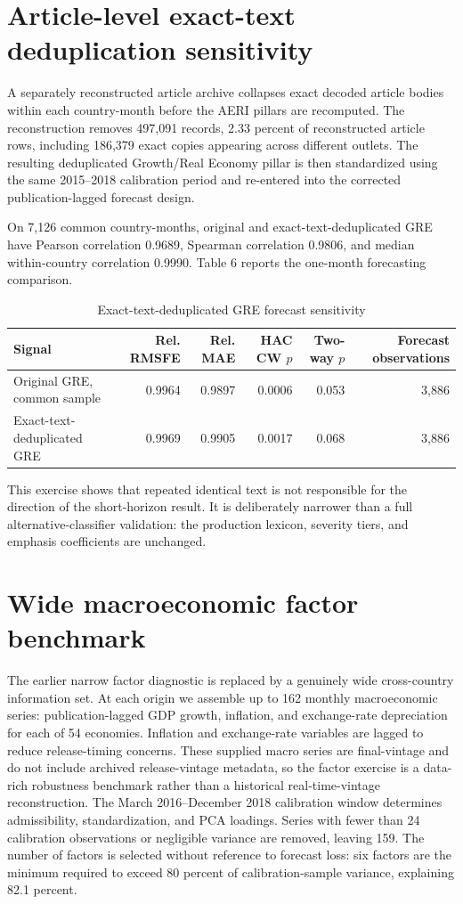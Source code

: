 \documentclass[12pt]{article}
\begin{document}
\section{Article-level exact-text deduplication sensitivity}
A separately reconstructed article archive collapses exact decoded article bodies within each country-month before the AERI pillars are recomputed. The reconstruction removes 497,091 records, 2.33 percent of reconstructed article rows, including 186,379 exact copies appearing across different outlets. The resulting deduplicated Growth/Real Economy pillar is then standardized using the same 2015--2018 calibration period and re-entered into the corrected publication-lagged forecast design.

On 7,126 common country-months, original and exact-text-deduplicated GRE have Pearson correlation 0.9689, Spearman correlation 0.9806, and median within-country correlation 0.9990. Table 6 reports the one-month forecasting comparison.
\begin{table}[htbp]
\centering\scriptsize
\caption{Exact-text-deduplicated GRE forecast sensitivity}
\begin{tabular}{lrrrrr}
\toprule
Signal & Rel. RMSFE & Rel. MAE & HAC CW $p$ & Two-way $p$ & Forecast observations\\
\midrule
Original GRE, common sample & 0.9964 & 0.9897 & 0.0006 & 0.053 & 3,886\\
Exact-text-deduplicated GRE & 0.9969 & 0.9905 & 0.0017 & 0.068 & 3,886\\
\bottomrule
\end{tabular}
\end{table}
This exercise shows that repeated identical text is not responsible for the direction of the short-horizon result. It is deliberately narrower than a full alternative-classifier validation: the production lexicon, severity tiers, and emphasis coefficients are unchanged.

\section{Wide macroeconomic factor benchmark}
The earlier narrow factor diagnostic is replaced by a genuinely wide cross-country information set. At each origin we assemble up to 162 monthly macroeconomic series: publication-lagged GDP growth, inflation, and exchange-rate depreciation for each of 54 economies. Inflation and exchange-rate variables are lagged to reduce release-timing concerns. These supplied macro series are final-vintage and do not include archived release-vintage metadata, so the factor exercise is a data-rich robustness benchmark rather than a historical real-time-vintage reconstruction. The March 2016--December 2018 calibration window determines admissibility, standardization, and PCA loadings. Series with fewer than 24 calibration observations or negligible variance are removed, leaving 159. The number of factors is selected without reference to forecast loss: six factors are the minimum required to exceed 80 percent of calibration-sample variance, explaining 82.1 percent.
\end{document}
